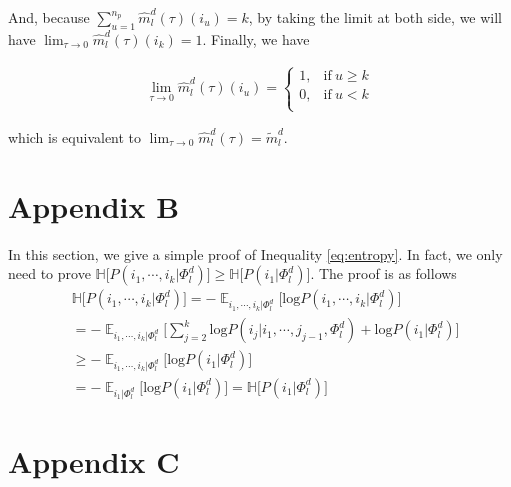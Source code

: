 \documentclass[11pt]{article}
\begin{document}
And, because $ \displaystyle{\mathop{\sum}_{u=1}^{n_p}}\hat{m}_l^d(\tau)(i_u) = k$, by taking the limit at both side, we will have $\lim_{\tau \rightarrow 0} \hat{m}_l^d(\tau)(i_k) = 1$. Finally, we have

\begin{align*}
\lim_{\tau \rightarrow 0} \hat{m}_l^d(\tau)(i_u) = \begin{cases}
      1, & \text{if}\ u \geqslant k \\
      0, & \text{if}\ u < k \\
    \end{cases}
\end{align*}

which is equivalent to $\lim_{\tau \rightarrow 0}\hat{m}_l^d(\tau) = \tilde{m}_l^d$.

\section{Appendix B}
\label{appendix:b}
In this section, we give a simple proof of Inequality \ref{eq:entropy}. In fact, we only need to prove $\mathbb{H} \big[ P(i_1,\cdots,i_k | \Phi_l^d) \big] \geqslant \mathbb{H} \big[ P(i_1 | \Phi_l^d) \big]$. The proof is as follows
\begin{align*}
&\mathbb{H} \big[ P(i_1,\cdots,i_k | \Phi_l^d) \big] = - \displaystyle{\mathop{\mathbb{E}}_{i_1,\cdots,i_k | \Phi_l^d}} \big[ \text{log}P(i_1,\cdots,i_k | \Phi_l^d) \big] \\
&= -\displaystyle{\mathop{\mathbb{E}}_{i_1,\cdots,i_k | \Phi_l^d}} \big[ \displaystyle{\sum_{j=2}^k}\text{log}P(i_j | i_1,\cdots,j_{j-1},\Phi_l^d) +  \text{log} P(i_1 | \Phi_l^d) \big] \\
&\geqslant -\displaystyle{\mathop{\mathbb{E}}_{i_1,\cdots,i_k | \Phi_l^d}} \big[ \text{log} P(i_1 | \Phi_l^d) \big] \\
&= -\displaystyle{\mathop{\mathbb{E}}_{i_1 | \Phi_l^d}} \big[ \text{log} P(i_1 | \Phi_l^d) \big] = \mathbb{H} \big[ P(i_1 | \Phi_l^d) \big]
\end{align*}
\section{Appendix C}
\label{appendix:c}
\end{document}
